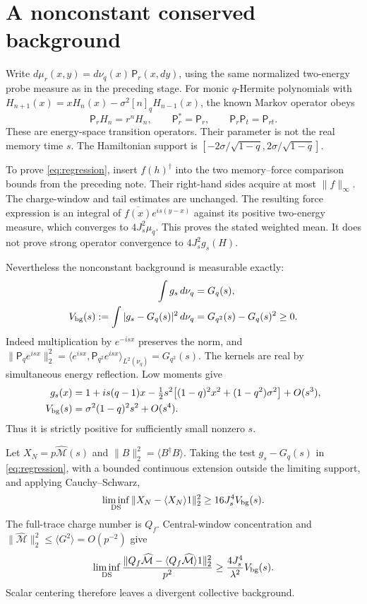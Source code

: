 \documentclass[11pt,a4paper]{article}
\newcommand{\av}[1]{\langle #1\rangle}
\newcommand{\MM}{\widehat{\mathcal M}}
\begin{document}
\newpage
\section{A nonconstant conserved background}
Write $d\mu_r(x,y)=d\nu_q(x)\,\mathsf P_r(x,dy)$, using the
same normalized two-energy probe measure as in the preceding stage.
For monic $q$-Hermite polynomials with
$H_{n+1}(x)=xH_n(x)-\sigma^2[n]_qH_{n-1}(x)$, the known Markov
operator obeys \cite{BKS}
\begin{equation}
 \mathsf P_rH_n=r^nH_n,\qquad
 \mathsf P_r^*=\mathsf P_r,\qquad \mathsf P_r\mathsf P_t=\mathsf P_{rt}.
\end{equation}
These are energy-space transition operators. Their parameter is not
the real memory time $s$. The Hamiltonian support is
$[-2\sigma/\sqrt{1-q},2\sigma/\sqrt{1-q}]$.

To prove \eqref{eq:regression}, insert $f(h)^\dagger$ into the two
memory--force comparison bounds from the preceding note. Their
right-hand sides acquire at most $\|f\|_\infty$. The charge-window
and tail estimates are unchanged. The resulting force expression is
an integral of $\overline{f(x)}e^{is(y-x)}$ against its positive
two-energy measure, which converges to $4J_s^2\mu_q$. This proves
the stated weighted mean. It does not prove strong operator
convergence to $4J_s^2g_s(H)$.

Nevertheless the nonconstant background is measurable exactly:
\begin{align}
 \int g_s\,d\nu_q&=G_q(s),\\
 V_{\rm bg}(s):=\int|g_s-G_q(s)|^2\,d\nu_q
 &=G_{q^2}(s)-G_q(s)^2\geq0.\label{eq:variance}
\end{align}
Indeed multiplication by $e^{-isx}$ preserves the norm, and
$\|\mathsf P_q e^{isx}\|_2^2
=\av{e^{isx},\mathsf P_{q^2}e^{isx}}_{L^2(\nu_q)}=G_{q^2}(s)$.
The kernels are real by simultaneous energy reflection. Low moments give
\begin{align}
 g_s(x)&=1+is(q-1)x
 -\tfrac12s^2\bigl[(1-q)^2x^2+(1-q^2)\sigma^2\bigr]+O(s^3),\\
 V_{\rm bg}(s)&=\sigma^2(1-q)^2s^2+O(s^4).
\end{align}
Thus it is strictly positive for sufficiently small nonzero $s$.

Let $X_N=p\MM(s)$ and $\|B\|_2^2=\av{B^\dagger B}$. Taking the
test $g_s-G_q(s)$ in \eqref{eq:regression}, with a bounded continuous
extension outside the limiting support, and applying Cauchy--Schwarz,
\begin{equation}
 \liminf_{\rm DS}\|X_N-\av{X_N}1\|_2^2
 \geq16J_s^4V_{\rm bg}(s).\label{eq:lower}
\end{equation}
The full-trace charge number is $Q_f$. Central-window concentration
and $\|\MM\|_2^2\leq\av{G^2}=O(p^{-2})$ give
\begin{equation}\label{eq:divergence}
 \liminf_{\rm DS}\frac{\|Q_f\MM-\av{Q_f\MM}1\|_2^2}{p^2}
 \geq\frac{4J_s^4}{\lambda^2}V_{\rm bg}(s).
\end{equation}
Scalar centering therefore leaves a divergent collective background.
\end{document}
